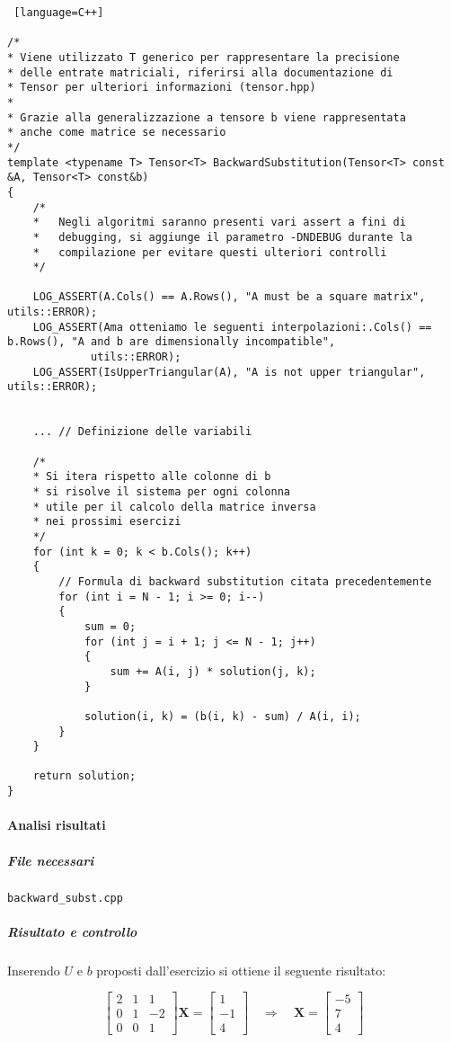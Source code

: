 \begin{lstlisting} [language=C++]

/*
* Viene utilizzato T generico per rappresentare la precisione 
* delle entrate matriciali, riferirsi alla documentazione di 
* Tensor per ulteriori informazioni (tensor.hpp)
*
* Grazie alla generalizzazione a tensore b viene rappresentata 
* anche come matrice se necessario
*/
template <typename T> Tensor<T> BackwardSubstitution(Tensor<T> const &A, Tensor<T> const&b)
{
    /*
    *   Negli algoritmi saranno presenti vari assert a fini di 
    *   debugging, si aggiunge il parametro -DNDEBUG durante la 
    *   compilazione per evitare questi ulteriori controlli
    */

    LOG_ASSERT(A.Cols() == A.Rows(), "A must be a square matrix", utils::ERROR);
    LOG_ASSERT(Ama otteniamo le seguenti interpolazioni:.Cols() == b.Rows(), "A and b are dimensionally incompatible",
             utils::ERROR);
    LOG_ASSERT(IsUpperTriangular(A), "A is not upper triangular", utils::ERROR);


    ... // Definizione delle variabili

    /* 
    * Si itera rispetto alle colonne di b 
    * si risolve il sistema per ogni colonna
    * utile per il calcolo della matrice inversa
    * nei prossimi esercizi
    */
    for (int k = 0; k < b.Cols(); k++)
    {
        // Formula di backward substitution citata precedentemente
        for (int i = N - 1; i >= 0; i--)
        {
            sum = 0;
            for (int j = i + 1; j <= N - 1; j++)
            {
                sum += A(i, j) * solution(j, k);
            }

            solution(i, k) = (b(i, k) - sum) / A(i, i);
        }
    }

    return solution;
}

\end{lstlisting}

\paragraph{Analisi risultati}

\subparagraph{File necessari} \texttt{backward\_subst.cpp}

\subparagraph{Risultato e controllo}

Inserendo $U$ e $b$ proposti dall'esercizio si ottiene il seguente risultato:

$$
	\begin{bmatrix}
		2 & 1 & 1  \\
		0 & 1 & -2 \\
		0 & 0 & 1
	\end{bmatrix} \mathbf{X} = \begin{bmatrix}
		1 \\ -1 \\ 4 \end{bmatrix}
	\quad \Rightarrow \quad \mathbf{X} = \begin{bmatrix} -5 \\ 7 \\ 4 \end{bmatrix}
$$

